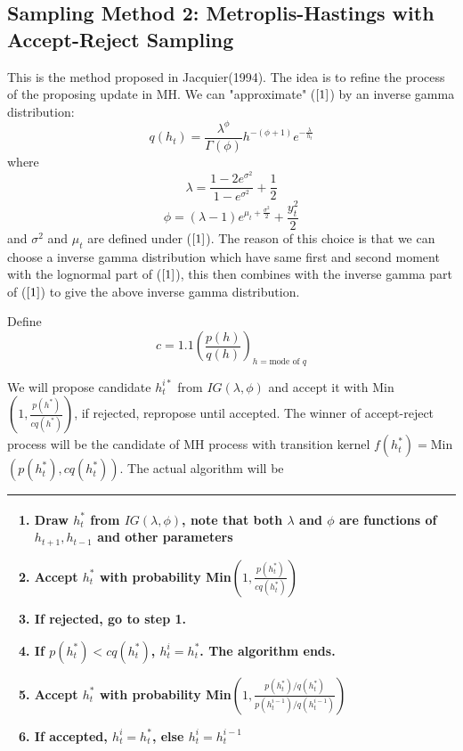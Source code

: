\documentclass{article}
\begin{document}
\subsection{Sampling Method 2: Metroplis-Hastings with Accept-Reject Sampling}
This is the method proposed in Jacquier(1994). The idea is to refine the process of the proposing update in MH. We can "approximate" ($\ref{1}$)  by an inverse gamma distribution:
\[
q(h_t)=\frac{\lambda^\phi}{\Gamma(\phi)}h^{-(\phi+1)}e^{-\frac{\lambda}{h_t}}
\]
where
\[
\lambda=\frac{1-2e^{\sigma^2}}{1-e^{\sigma^2}}+\frac{1}{2}
\]
\[
\phi=(\lambda-1)e^{\mu_t+\frac{\sigma^2}{2}}+\frac{y_t^2}{2}
\]
and $\sigma^2$ and $\mu_t$ are defined under ($\ref{1}$). The reason of this choice is that we can choose a inverse gamma distribution which have same first and second moment with the lognormal part of ($\ref{1}$), this then combines with the inverse gamma part of ($\ref{1}$) to give the above inverse gamma distribution.

Define
\[
c=1.1\left(\frac{p(h)}{q(h)}\right)_{h=\textrm{mode of } q}
\]

We will propose candidate $h^{i*}_t$ from $IG(\lambda,\phi)$ and accept it with Min$(1,\frac{p(h^*)}{cq(h^*)})$, if rejected, repropose until accepted. The winner of accept-reject process will be the candidate of MH process with transition kernel $f(h_t^*)=$Min$(p(h_t^*),cq(h_t^*))$. The actual algorithm will be

\begin{tabular}{|p{11cm}|}
\hline
\begin{enumerate}
\item
Draw $ h^*_t$ from $IG(\lambda,\phi)$, note that both $\lambda$ and $\phi$ are functions of $h_{t+1},h_{t-1}$ and other parameters
\item
Accept $h^*_t$ with probability Min$(1,\frac{p(h^*_t)}{cq(h^*_t)})$
\item
If rejected, go to step 1.
\item
If $p(h^*_t)<cq(h^*_t)$, $h^i_t=h^*_t$. The algorithm ends.
\item
Accept $h^*_t$ with probability Min$(1,\frac{p(h^*_t)/q(h^*_t)}{p(h^{i-1}_t)/q(h^{i-1}_t)})$
\item
If accepted,  $h^i_t=h^*_t$, else $h^i_t=h^{i-1}_t$
\end{enumerate}\\
\hline
\end{tabular}
\end{document}
